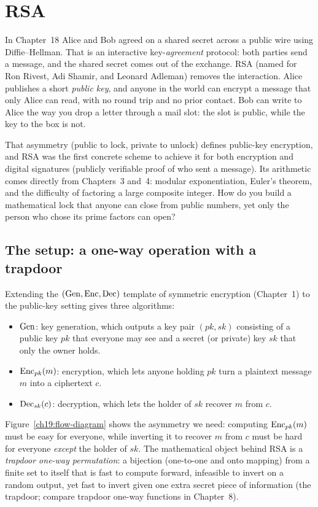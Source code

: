\chapter{RSA}

In Chapter~18 Alice and Bob agreed on a shared secret across a public wire using Diffie--Hellman. That is an interactive key-\emph{agreement} protocol: both parties send a message, and the shared secret comes out of the exchange. RSA (named for Ron Rivest, Adi Shamir, and Leonard Adleman) removes the interaction. Alice publishes a short \emph{public key}, and anyone in the world can encrypt a message that only Alice can read, with no round trip and no prior contact. Bob can write to Alice the way you drop a letter through a mail slot: the slot is public, while the key to the box is not.

That asymmetry (public to lock, private to unlock) defines public-key encryption, and RSA was the first concrete scheme to achieve it for both encryption and digital signatures (publicly verifiable proof of who sent a message). Its arithmetic comes directly from Chapters~3 and~4: modular exponentiation, Euler's theorem, and the difficulty of factoring a large composite integer. How do you build a mathematical lock that anyone can close from public numbers, yet only the person who chose its prime factors can open?

\chapterline

\section{The setup: a one-way operation with a trapdoor}
\label{ch19:setup}

Extending the $(\operatorname{Gen}, \operatorname{Enc}, \operatorname{Dec})$ template of symmetric encryption (Chapter~1) to the public-key setting gives three algorithms:

\begin{itemize}
  \item $\operatorname{Gen}$: key generation, which outputs a key pair $(pk, sk)$ consisting of a public key $pk$ that everyone may see and a secret (or private) key $sk$ that only the owner holds.
  \item $\operatorname{Enc}_{pk}(m)$: encryption, which lets anyone holding $pk$ turn a plaintext message $m$ into a ciphertext $c$.
  \item $\operatorname{Dec}_{sk}(c)$: decryption, which lets the holder of $sk$ recover $m$ from $c$.
\end{itemize}

Figure~\ref{ch19:flow-diagram} shows the asymmetry we need: computing $\operatorname{Enc}_{pk}(m)$ must be easy for everyone, while inverting it to recover $m$ from $c$ must be hard for everyone \emph{except} the holder of $sk$. The mathematical object behind RSA is a \emph{trapdoor one-way permutation}: a bijection (one-to-one and onto mapping) from a finite set to itself that is fast to compute forward, infeasible to invert on a random output, yet fast to invert given one extra secret piece of information (the trapdoor; compare trapdoor one-way functions in Chapter~8).

